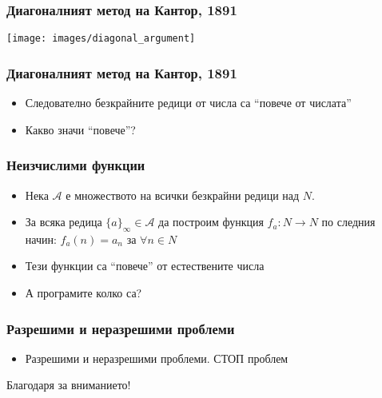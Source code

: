 \documentclass{beamer}
\begin{document}
\begin{frame}[fragile]
\frametitle{Диагоналният метод на Кантор, 1891}


\texttt{[image: images/diagonal\_argument]}


\end{frame}


\begin{frame}[fragile]
\frametitle{Диагоналният метод на Кантор, 1891}


\begin{itemize}
  \item Следователно безкрайните редици от числа са ``повече от числата''
  \item Какво значи ``повече''?
\end{itemize}


\end{frame}

\begin{frame}[fragile]
\frametitle{Неизчислими функции}


\begin{itemize}
  \item Нека $\mathcal{A}$ е множеството на всички безкрайни редици над $N$.
  \item За всяка редица $\{a\}_\infty \in \mathcal{A}$ да построим функция $f_a : N \rightarrow N$ по следния начин: $f_a(n)=a_n$ за $\forall n \in N$
  \item Тези функции са ``повече'' от естествените числа
  \item А програмите колко са?
\end{itemize}


\end{frame}

\begin{frame}[fragile]
\frametitle{Разрешими и неразрешими проблеми}


\begin{itemize}
    \item Разрешими и неразрешими проблеми. СТОП проблем
\end{itemize}


\end{frame}


\begin{frame}
\centerline{Благодаря за вниманието!}
\end{frame}
\end{document}
